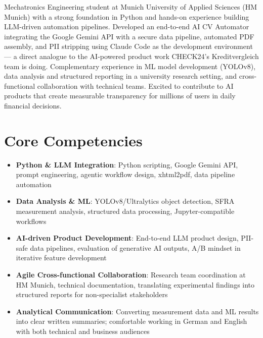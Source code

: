 \documentclass[11pt,a4paper,sans]{moderncv}
\begin{document}
\makecvtitle


\vspace{6pt}
\small{Mechatronics Engineering student at Munich University of Applied Sciences (HM Munich) with a strong foundation in Python and hands-on experience building LLM-driven automation pipelines. Developed an end-to-end AI CV Automator integrating the Google Gemini API with a secure data pipeline, automated PDF assembly, and PII stripping using Claude Code as the development environment --- a direct analogue to the AI-powered product work CHECK24's Kreditvergleich team is doing. Complementary experience in ML model development (YOLOv8), data analysis and structured reporting in a university research setting, and cross-functional collaboration with technical teams. Excited to contribute to AI products that create measurable transparency for millions of users in daily financial decisions.}


\section{Core Competencies}
\vspace{1pt}
\begin{itemize}

\item \textbf{Python \& LLM Integration}: Python scripting, Google Gemini API, prompt engineering, agentic workflow design, xhtml2pdf, data pipeline automation

\item \textbf{Data Analysis \& ML}: YOLOv8/Ultralytics object detection, SFRA measurement analysis, structured data processing, Jupyter-compatible workflows

\item \textbf{AI-driven Product Development}: End-to-end LLM product design, PII-safe data pipelines, evaluation of generative AI outputs, A/B mindset in iterative feature development

\item \textbf{Agile Cross-functional Collaboration}: Research team coordination at HM Munich, technical documentation, translating experimental findings into structured reports for non-specialist stakeholders

\item \textbf{Analytical Communication}: Converting measurement data and ML results into clear written summaries; comfortable working in German and English with both technical and business audiences

\end{itemize}
\end{document}
